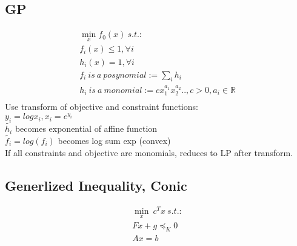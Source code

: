 \documentclass[8pt]{extarticle}
\newcommand{\R}{\mathbb{R}}
\begin{document}
\begin{multicols*}{2}
  \subsection*{GP}
  \begin{align*}
    \min_x  f_0(x)\ s.t.:\\
    f_i(x) \leq 1, \forall i\\
    h_i(x) = 1, \forall i\\
    f_i\ is\ a\ posynomial := \sum_i h_i\\
    h_i\ is\ a\ monomial := cx_1^{a_1}x_2^{a_2}.., c>0, a_i \in \R\\
  \end{align*}
  Use transform of objective and constraint functions:\\
  $y_i=log x_i, x_i=e^{y_i}$\\
  $\tilde{h_i}$ becomes exponential of affine function\\
  $\tilde{f_i} = log(f_i)$ becomes log sum exp (convex)\\
  If all constraints and objective are monomials, reduces to LP after transform.

  \subsection*{Generlized Inequality, Conic}
    \begin{align*}
    \min_x\ c^Tx\ s.t.:\\
    F x + g \preceq_K 0\\
    Ax=b
    \end{align*}
    

\end{multicols*}
\end{document}
